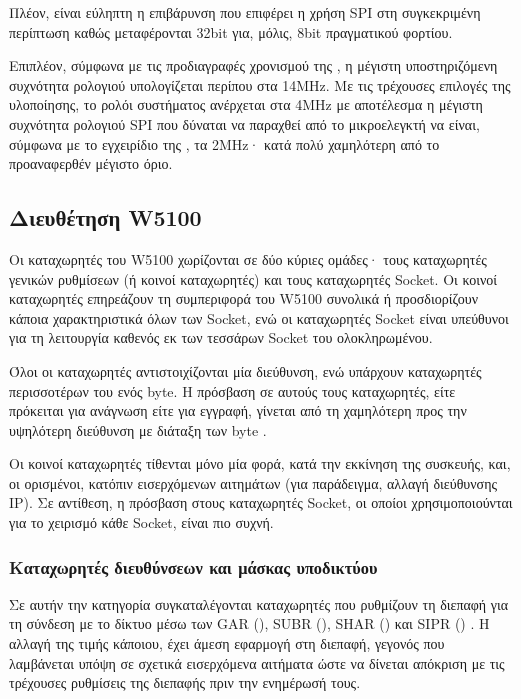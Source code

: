 Πλέον, είναι εύληπτη η επιβάρυνση που επιφέρει η χρήση SPI στη συγκεκριμένη
περίπτωση καθώς μεταφέρονται 32bit για, μόλις, 8bit πραγματικού φορτίου.

Επιπλέον, σύμφωνα με τις προδιαγραφές χρονισμού της \textcite[66]{wiz11:w5100},
η μέγιστη υποστηριζόμενη συχνότητα ρολογιού υπολογίζεται περίπου στα 14MHz. Με
τις τρέχουσες επιλογές της υλοποίησης, το ρολόι συστήματος ανέρχεται στα 4MHz
με αποτέλεσμα η μέγιστη συχνότητα ρολογιού SPI που δύναται να παραχθεί από το
μικροελεγκτή να είναι, σύμφωνα με το εγχειρίδιο της
\textcite[179--180]{atmel13}, τα 2MHz· κατά πολύ χαμηλότερη από το προαναφερθέν
μέγιστο όριο.


\subsection{Διευθέτηση W5100}

Οι καταχωρητές του W5100 χωρίζονται σε δύο κύριες ομάδες· τους καταχωρητές
γενικών ρυθμίσεων (ή κοινοί καταχωρητές) και τους καταχωρητές Socket. Οι κοινοί
καταχωρητές επηρεάζουν τη συμπεριφορά του W5100 συνολικά ή προσδιορίζουν κάποια
χαρακτηριστικά όλων των Socket, ενώ οι καταχωρητές Socket είναι υπεύθυνοι για
τη λειτουργία καθενός εκ των τεσσάρων Socket του ολοκληρωμένου.

Όλοι οι καταχωρητές αντιστοιχίζονται μία διεύθυνση, ενώ υπάρχουν καταχωρητές
περισσοτέρων του ενός byte. Η πρόσβαση σε αυτούς τους καταχωρητές, είτε
πρόκειται για ανάγνωση είτε για εγγραφή, γίνεται από τη χαμηλότερη προς την
υψηλότερη διεύθυνση με  διάταξη των byte
\parencite[32--33,35]{wiz11:w5100}.

Οι κοινοί καταχωρητές τίθενται μόνο μία φορά, κατά την εκκίνηση της συσκευής,
και, οι ορισμένοι, κατόπιν εισερχόμενων αιτημάτων (για παράδειγμα, αλλαγή
διεύθυνσης IP). Σε αντίθεση, η πρόσβαση στους καταχωρητές Socket, οι οποίοι
χρησιμοποιούνται για το χειρισμό κάθε Socket, είναι πιο συχνή.


\subsubsection{Καταχωρητές διευθύνσεων και μάσκας υποδικτύου}
\label{ssubsec:network:addr-registers}

Σε αυτήν την κατηγορία συγκαταλέγονται καταχωρητές που ρυθμίζουν τη διεπαφή για
τη σύνδεση με το δίκτυο μέσω των GAR (),
SUBR (), SHAR ()
και SIPR () \parencite[20]{wiz11:w5100}. Η αλλαγή
της τιμής κάποιου, έχει άμεση εφαρμογή στη διεπαφή, γεγονός που λαμβάνεται υπόψη
σε σχετικά εισερχόμενα αιτήματα ώστε να δίνεται απόκριση με τις τρέχουσες
ρυθμίσεις της διεπαφής πριν την ενημέρωσή τους.


